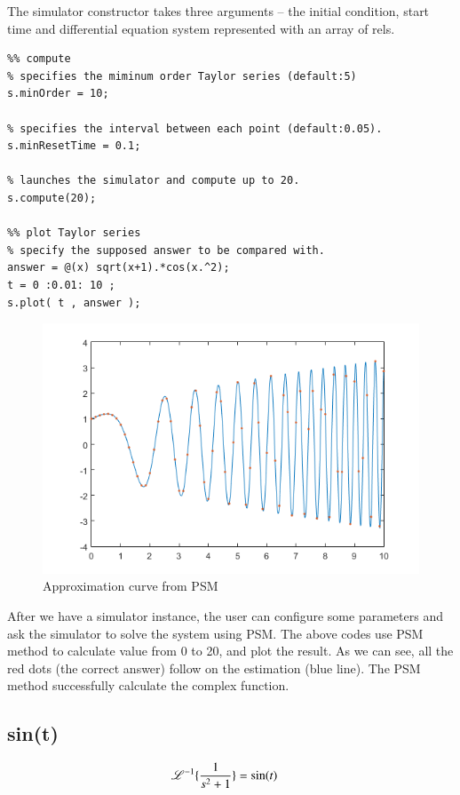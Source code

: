 \documentclass[12pt]{article}
\begin{document}
The simulator constructor takes three arguments -- the initial condition, start time and differential equation system represented with an array of rels.

\begin{lstlisting}
%% compute
% specifies the miminum order Taylor series (default:5)
s.minOrder = 10; 

% specifies the interval between each point (default:0.05).
s.minResetTime = 0.1; 

% launches the simulator and compute up to 20.
s.compute(20);

%% plot Taylor series
% specify the supposed answer to be compared with.
answer = @(x) sqrt(x+1).*cos(x.^2);
t = 0 :0.01: 10 ;
s.plot( t , answer );
\end{lstlisting}

\begin{figure}
\caption{Approximation curve from PSM}
\includegraphics[scale=1]{nastyProb.png}
\end{figure}

After we have a simulator instance, the user can configure some parameters and ask the simulator to solve the system using PSM. The above codes use PSM method to calculate value from 0 to 20, and plot the result. As we can see, all the red dots (the correct answer) follow on the estimation (blue line). The PSM method successfully calculate the complex function.

\clearpage
\subsection{sin(t)}

\begin{equation}
\mathscr{L}^{-1}\{\frac{1}{s^2 + 1}\} = \sin(t) \quad\scriptscriptstyle
\end{equation}
\end{document}
